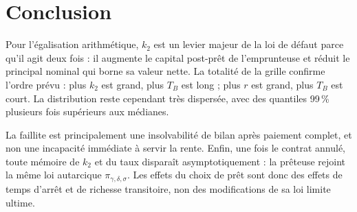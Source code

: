 \documentclass[11pt,a4paper]{article}
\begin{document}
\section{Conclusion}

Pour l'égalisation arithmétique, $k_2$ est un levier majeur de la loi de
défaut parce qu'il agit deux fois : il augmente le capital post-prêt de
l'emprunteuse et réduit le principal nominal qui borne sa valeur nette.
La totalité de la grille confirme l'ordre prévu : plus $k_2$ est grand,
plus $T_B$ est long ; plus $r$ est grand, plus $T_B$ est court. La
distribution reste cependant très dispersée, avec des quantiles 99\,\%
plusieurs fois supérieurs aux médianes.

La faillite est principalement une insolvabilité de bilan après paiement
complet, et non une incapacité immédiate à servir la rente. Enfin, une fois
le contrat annulé, toute mémoire de $k_2$ et du taux disparaît
asymptotiquement : la prêteuse rejoint la même loi autarcique
$\pi_{\gamma,\delta,\sigma}$. Les effets du choix de prêt sont donc des
effets de temps d'arrêt et de richesse transitoire, non des modifications
de sa loi limite ultime.
\end{document}
